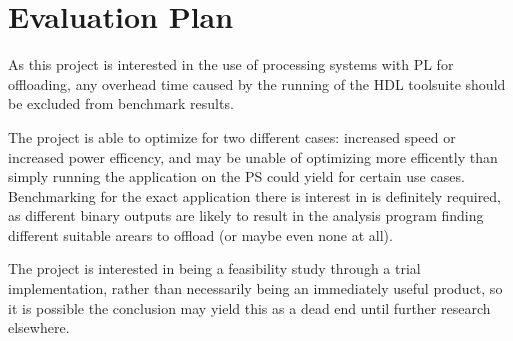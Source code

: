 \documentclass[a4paper]{article}
\begin{document}
\section{Evaluation Plan}
As this project is interested in the use of processing systems with PL for offloading, any overhead time caused by the running of the HDL toolsuite should be excluded from benchmark results.

The project is able to optimize for two different cases: increased speed or increased power efficency, and may be unable of optimizing more efficently than simply running the application on the PS could yield for certain use cases. Benchmarking for the exact application there is interest in is definitely required, as different binary outputs are likely to result in the analysis program finding different suitable arears to offload (or maybe even none at all).

The project is interested in being a feasibility study through a trial implementation, rather than necessarily being an immediately useful product, so it is possible the conclusion may yield this as a dead end until further research elsewhere.
\end{document}
